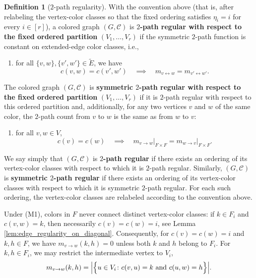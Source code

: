 \documentclass[12pt]{amsart}
\theoremstyle{plain}
\theoremstyle{definition}
\newtheorem{definition}[theorem]{Definition}
\theoremstyle{remark}
\newcommand{\1}{\mathbf{1}}
\begin{document}
\begin{definition}[$2$-path regularity]\label{def:2_path_regularity}
With the convention above (that is, after relabeling the vertex-color classes so
that the fixed ordering satisfies $\eta_i=i$ for every $i\in[r]$), a colored
graph \((G,\mathcal{C})\) is
\textbf{$2$-path regular with respect to the fixed ordered partition}
$(V_1,\ldots,V_r)$ if the symmetric $2$-path function is constant on
extended-edge color classes, i.e.,
\begin{enumerate}
    \item[(M1)] for all \(\{v, w\}, \{v', w'\} \in \tilde{E}\), we have
    \[
c(v,w)=c(v',w')\quad\implies\quad     m_{v\leftrightarrow w} = m_{v'\leftrightarrow w'}.
    \]
\end{enumerate}
The colored graph \((G,\mathcal{C})\) is
\textbf{symmetric $2$-path regular with respect to the fixed ordered partition}
$(V_1,\ldots,V_r)$ if it is
$2$-path regular with respect to this ordered partition and, additionally, for
any two vertices $v$ and $w$ of the same color, the $2$-path count from $v$ to
$w$ is the same as from $w$ to $v$:
\begin{enumerate}
 \item[(M2)] for all $v,w\in V$, 
 \[
    c(v)=c(w)\quad\implies\quad 
    m_{v\to w}\big|_{F\times F} = m_{w\to v}\big|_{F\times F}.
    \]
\end{enumerate}

We say simply that $(G,\mathcal{C})$ is \textbf{$2$-path regular} if there exists an
ordering of its vertex-color classes with respect to which it is $2$-path
regular. Similarly, $(G,\mathcal{C})$ is \textbf{symmetric $2$-path regular} if there
exists an ordering of its vertex-color classes with respect to which it is
symmetric $2$-path regular. For each such ordering, the vertex-color classes
are relabeled according to the convention above.
\end{definition}

Under (M1), colors in $F$ never connect distinct vertex-color classes:
if $k\in F_i$ and $c(v,w)=k$, then necessarily $c(v)=c(w)=i$, see Lemma \ref{lem:edge_regularity_on_diagonal}.
Consequently, for $c(v)=c(w)=i$ and $k,h\in F$, we have
$m_{v\to w}(k,h)=0$ unless both $k$ and $h$ belong to $F_i$.
For $k,h\in F_i$, we may restrict the intermediate vertex to $V_i$,
\begin{align*}
m_{v\to w}(k, h) = \Bigl| \Big\{ u \in V_{i} \colon c(v,u)=k\mbox{ and } c(u,w)=h\Big\} \Bigr|.
\end{align*}
\end{document}

